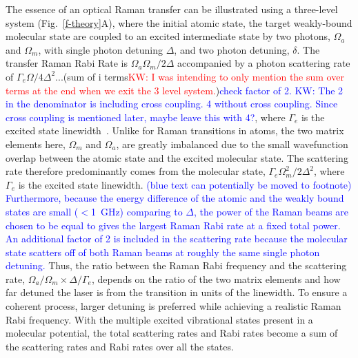 \documentclass[aps,prl,twocolumn,groupedaddress]{revtex4-1}
\begin{document}
The essence of an optical Raman transfer can be illustrated using a three-level system (Fig.~\ref{f-theory}A), where the initial atomic state, the target weakly-bound molecular state are coupled to an excited intermediate state by two photons, $\Omega_a$ and $\Omega_m$, with single photon detuning $ \Delta $, and two photon detuning, $ \delta$.  %
The transfer Raman Rabi Rate is $ \Omega_a\Omega_m / 2\Delta$ accompanied by a photon scattering rate of $\Gamma_e \Omega / 4\Delta^2$...(sum of i terms\textcolor{red}{KW: I was intending to only mention the sum over terms at the end when we exit the 3 level system.})\textcolor{blue}{check factor of 2. KW: The 2 in the denominator is including cross coupling. 4 without cross coupling. Since cross coupling is mentioned later, maybe leave this with 4?}, where $ \Gamma_e $ is the excited state linewidth~\cite{Wineland2003}. %
Unlike for Raman transitions in atoms, the two matrix elements here, $ \Omega_m$ and $ \Omega_a$, are greatly imbalanced %
due to the small wavefunction overlap between the atomic state and the excited molecular state. The scattering rate therefore predominantly comes from the molecular state, $ \Gamma_e \Omega_m^2 / 2\Delta^2$, where $ \Gamma_e $ is the excited state linewidth. \textcolor{blue}{(blue text can potentially be moved to footnote) Furthermore, because the energy difference of the atomic and the weakly bound states are small ($<$1~GHz) comparing to $\Delta$, the power of the Raman beams are chosen to be equal to gives the largest Raman Rabi rate at a fixed total power. %
  An additional factor of 2 is included in the scattering rate because the molecular state scatters off of both Raman beams at roughly the same single photon detuning. } Thus, the ratio between the Raman Rabi frequency and the scattering rate, $ \Omega_a/\Omega_m \times \Delta/\Gamma_e $, depends on the ratio of the two matrix elements and how far detuned the laser is from the transition in units of the linewidth. To ensure a coherent process, larger detuning is preferred while achieving a realistic Raman Rabi frequency. %
With the multiple excited vibrational states present in a molecular potential, the total scattering rates and Rabi rates become a sum of the scattering rates and Rabi rates over all the states. %
\end{document}
